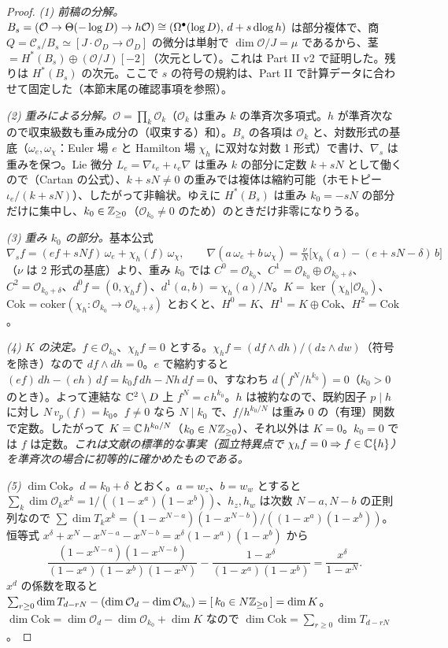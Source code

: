 \begin{proof}
\emph{(1) 前稿の分解。}$B_s=(\mathcal O\to\Theta(-\log D)\to h\mathcal O)\cong(\Omega^\bullet(\log D),\,d+s\,\mathrm{dlog}\, h)$ は部分複体で、商 $Q=\mathcal C_s/B_s\simeq[J\!\cdot\!\mathcal O_D\to\mathcal O_D]$ の微分は単射で $\dim\mathcal O/J=\mu$ であるから、茎 $=H^*(B_s)\oplus(\mathcal O/J)[-2]$（次元として）。これは Part II v2 で証明した\tP。残りは $H^*(B_s)$ の次元。ここで $s$ の符号の規約は、Part II で計算データに合わせて固定した（本節末尾の確認事項を参照）。

\emph{(2) 重みによる分解。}$\mathcal O=\prod_k\mathcal O_k$（$\mathcal O_k$ は重み $k$ の準斉次多項式。$h$ が準斉次なので収束級数も重み成分の（収束する）和）。$B_s$ の各項は $\mathcal O_k$ と、対数形式の基底（$\omega_e,\omega_\chi$：Euler 場 $e$ と Hamilton 場 $\chi_h$ に双対な対数 1 形式）で書け、$\nabla_s$ は重みを保つ。Lie 微分 $L_e=\nabla\iota_e+\iota_e\nabla$ は重み $k$ の部分に定数 $k+sN$ として働くので（Cartan の公式）、$k+sN\ne0$ の重みでは複体は縮約可能（ホモトピー $\iota_e/(k+sN)$）、したがって非輪状。ゆえに $H^*(B_s)$ は重み $k_0=-sN$ の部分だけに集中し、$k_0\in\mathbb Z_{\ge0}$（$\mathcal O_{k_0}\ne0$ のため）のときだけ非零になりうる。

\emph{(3) 重み $k_0$ の部分。}基本公式
\[\nabla_sf=(ef+sNf)\,\omega_e+\chi_h(f)\,\omega_\chi,\qquad\nabla(a\,\omega_e+b\,\omega_\chi)=\tfrac{\nu}{N}\bigl[\chi_h(a)-(e+sN-\delta)\,b\bigr]\]
（$\nu$ は 2 形式の基底）より、重み $k_0$ では $C^0=\mathcal O_{k_0}$、$C^1=\mathcal O_{k_0}\oplus\mathcal O_{k_0+\delta}$、$C^2=\mathcal O_{k_0+\delta}$、$d^0f=(0,\chi_hf)$、$d^1(a,b)=\chi_h(a)/N$。$K=\ker(\chi_h|\mathcal O_{k_0})$、$\mathrm{Cok}=\mathrm{coker}(\chi_h:\mathcal O_{k_0}\to\mathcal O_{k_0+\delta})$ とおくと、$H^0=K$、$H^1=K\oplus\mathrm{Cok}$、$H^2=\mathrm{Cok}$。

\emph{(4) $K$ の決定。}$f\in\mathcal O_{k_0}$、$\chi_hf=0$ とする。$\chi_hf=(df\wedge dh)/(dz\wedge dw)$（符号を除き）なので $df\wedge dh=0$。$e$ で縮約すると $(ef)\,dh-(eh)\,df=k_0f\,dh-Nh\,df=0$、すなわち $d(f^N/h^{k_0})=0$（$k_0>0$ のとき）。よって連結な $\mathbb C^2\setminus D$ 上 $f^N=c\,h^{k_0}$。$h$ は被約なので、既約因子 $p\mid h$ に対し $N\,v_p(f)=k_0$。$f\ne0$ なら $N\mid k_0$ で、$f/h^{k_0/N}$ は重み $0$ の（有理）関数で定数。したがって $K=\mathbb C\,h^{k_0/N}$（$k_0\in N\mathbb Z_{\ge0}$）、それ以外は $K=0$。$k_0=0$ では $f$ は定数。\emph{これは文献の標準的な事実（孤立特異点で $\chi_hf=0\Rightarrow f\in\mathbb C\{h\}$）を準斉次の場合に初等的に確かめたものである。}

\emph{(5) $\dim\mathrm{Cok}$。}$d=k_0+\delta$ とおく。$a=w_z$、$b=w_w$ とすると $\sum_k\dim\mathcal O_kx^k=1/((1-x^a)(1-x^b))$、$h_z,h_w$ は次数 $N-a,N-b$ の正則列なので $\sum\dim T_kx^k=(1-x^{N-a})(1-x^{N-b})/((1-x^a)(1-x^b))$。恒等式 $x^\delta+x^N-x^{N-a}-x^{N-b}=x^\delta(1-x^a)(1-x^b)$ から
\[\frac{(1-x^{N-a})(1-x^{N-b})}{(1-x^a)(1-x^b)(1-x^N)}-\frac{1-x^\delta}{(1-x^a)(1-x^b)}=\frac{x^\delta}{1-x^N}.\]
$x^d$ の係数を取ると $\sum_{r\ge0}\dim T_{d-rN}-(\dim\mathcal O_d-\dim\mathcal O_{k_0})=[\,k_0\in N\mathbb Z_{\ge0}\,]=\dim K$。$\dim\mathrm{Cok}=\dim\mathcal O_d-\dim\mathcal O_{k_0}+\dim K$ なので $\dim\mathrm{Cok}=\sum_{r\ge0}\dim T_{d-rN}$。


\end{proof}
